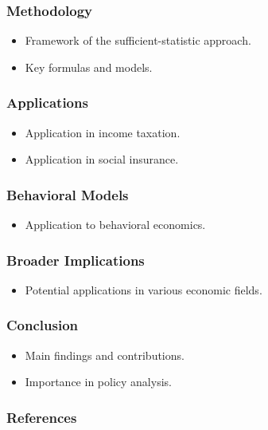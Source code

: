 \documentclass{beamer}
\begin{document}
\begin{frame}
\frametitle{Methodology}
\begin{itemize}
    \item Framework of the sufficient-statistic approach.
    \item Key formulas and models.
\end{itemize}
\end{frame}

\begin{frame}
\frametitle{Applications}
\begin{itemize}
    \item Application in income taxation.
    \item Application in social insurance.
\end{itemize}
\end{frame}

\begin{frame}
\frametitle{Behavioral Models}
\begin{itemize}
    \item Application to behavioral economics.
\end{itemize}
\end{frame}

\begin{frame}
\frametitle{Broader Implications}
\begin{itemize}
    \item Potential applications in various economic fields.
\end{itemize}
\end{frame}

\begin{frame}
\frametitle{Conclusion}
\begin{itemize}
    \item Main findings and contributions.
    \item Importance in policy analysis.
\end{itemize}
\end{frame}

\begin{frame}
\frametitle{References}
\end{frame}
\end{document}
